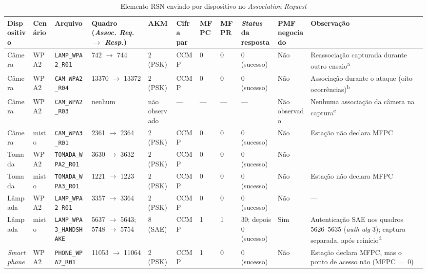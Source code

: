 \begin{landscape}
\begin{table}[p]
\centering
\caption{Elemento RSN enviado por dispositivo no \textit{Association Request}}
\label{tab:ap-rsn-estacoes}
\marcadoresTabela
\scriptsize
\setlength{\tabcolsep}{2.5pt}
\renewcommand{\arraystretch}{1.15}
\begin{tabular}{|L{2.0cm}|L{1.3cm}|L{3.6cm}|L{2.4cm}|L{1.5cm}|L{1.1cm}|L{1.1cm}|L{1.1cm}|L{2.0cm}|L{1.6cm}|L{3.4cm}|}
\hline
\textbf{Dispositivo} & \textbf{Cenário} & \textbf{Arquivo} & \textbf{Quadro (\textit{Assoc. Req.} $\rightarrow$ \textit{Resp.})} & \textbf{AKM} & \textbf{Cifra par} & \textbf{MFPC} & \textbf{MFPR} & \textbf{\textit{Status} da resposta} & \textbf{PMF negociado} & \textbf{Observação} \\ \hline
Câmera & WPA2 & \texttt{LAMP\_WPA2\_R01} & 742 $\rightarrow$ 744 & 2 (PSK) & CCMP & 0 & 0 & 0 (sucesso) & Não & Reassociação capturada durante outro ensaio\textsuperscript{a} \\ \hline
Câmera & WPA2 & \texttt{CAM\_WPA2\_R04} & 13370 $\rightarrow$ 13372 & 2 (PSK) & CCMP & 0 & 0 & 0 (sucesso) & Não & Associação durante o ataque (oito ocorrências)\textsuperscript{b} \\ \hline
Câmera & WPA2 & \texttt{CAM\_WPA2\_R03} & nenhum & não observado & --- & --- & --- & --- & Não observado & Nenhuma associação da câmera na captura\textsuperscript{c} \\ \hline
Câmera & misto & \texttt{CAM\_WPA3\_R01} & 2361 $\rightarrow$ 2364 & 2 (PSK) & CCMP & 0 & 0 & 0 (sucesso) & Não & Estação não declara MFPC \\ \hline
Tomada & WPA2 & \texttt{TOMADA\_WPA2\_R01} & 3630 $\rightarrow$ 3632 & 2 (PSK) & CCMP & 0 & 0 & 0 (sucesso) & Não & --- \\ \hline
Tomada & misto & \texttt{TOMADA\_WPA3\_R01} & 1221 $\rightarrow$ 1223 & 2 (PSK) & CCMP & 0 & 0 & 0 (sucesso) & Não & Estação não declara MFPC \\ \hline
Lâmpada & WPA2 & \texttt{LAMP\_WPA2\_R01} & 3357 $\rightarrow$ 3364 & 2 (PSK) & CCMP & 0 & 0 & 0 (sucesso) & Não & --- \\ \hline
Lâmpada & misto & \texttt{LAMP\_WPA3\_HANDSHAKE} & 5637 $\rightarrow$ 5643; 5748 $\rightarrow$ 5754 & 8 (SAE) & CCMP & 1 & 1 & 30; depois 0 (sucesso) & Sim & Autenticação SAE nos quadros 5626--5635 (\textit{auth alg} 3); captura separada, após reinício\textsuperscript{d} \\ \hline
\textit{Smartphone} & WPA2 & \texttt{PHONE\_WPA2\_R01} & 11053 $\rightarrow$ 11064 & 2 (PSK) & CCMP & 1 & 0 & 0 (sucesso) & Não & Estação declara MFPC, mas o ponto de acesso não (MFPC~=~0) \\ \hline

\end{tabular}
\end{table}
\end{landscape}
